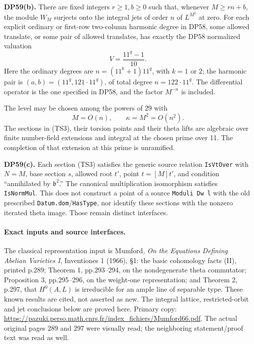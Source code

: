 \begin{theorem}
\textbf{DP59(b).} There are fixed integers \(r\ge1,b\ge0\) such that, whenever \(M\ge rn+b\), the module \(W_M\) surjects onto the integral jets of order \(n\) of \(L^{M^2}\) at zero. For each explicit ordinary or first-row two-column harmonic degree in DP58, some allowed translate, or some pair of allowed translates, has exactly the DP58 normalized valuation \[
 V=\frac{11^q-1}{10}.
 \tag{TS5}
\] Here the ordinary degrees are \(n=(11^k+1)11^q\), with \(k=1\) or \(2\); the harmonic pair is \((a,b)=(11^q,121\cdot11^q)\), of total degree \(n=122\cdot11^q\). The differential operator is the one specified in DP58, and the factor \(M^{-n}\) is included.

The level may be chosen among the powers of 29 with \[
 M=O(n),\qquad \kappa=M^2=O(n^2).
 \tag{TS6}
\] The sections in (TS3), their torsion points and their theta lifts are algebraic over finite number-field extensions and integral at the chosen prime over 11. The completion of that extension at this prime is unramified.

\textbf{DP59(c).} Each section (TS3) satisfies the generic source relation \texttt{IsVtOver} with \(N=M\), base section \(s\), allowed root \(t'\), point \(t=[M]t'\), and condition ``annihilated by \(\mathfrak b^2\).'' The canonical multiplication isomorphism satisfies \texttt{IsNormMul}. This does not construct a point of a source \texttt{Moduli\ Dw\ l} with the old prescribed \texttt{Datum.dom}/\texttt{HasType}, nor identify these sections with the nonzero iterated theta image. Those remain distinct interfaces.
\end{theorem}

\paragraph{Exact inputs and source interfaces.}
The classical representation input is Mumford, \emph{On the Equations Defining Abelian Varieties I}, Inventiones 1 (1966), §1: the basic cohomology facts (II), printed p.289; Theorem 1, pp.293--294, on the nondegenerate theta commutator; Proposition 3, pp.295--296, on the weight-one representation; and Theorem 2, p.297, that \(H^0(A,L)\) is irreducible for an ample line of separable type. These known results are cited, not asserted as new. The integral lattice, restricted-orbit and jet conclusions below are proved here. Primary copy: \url{https://pazuki.perso.math.cnrs.fr/index_fichiers/Mumford66.pdf}. The actual original pages 289 and 297 were visually read; the neighboring statement/proof text was read as well.


